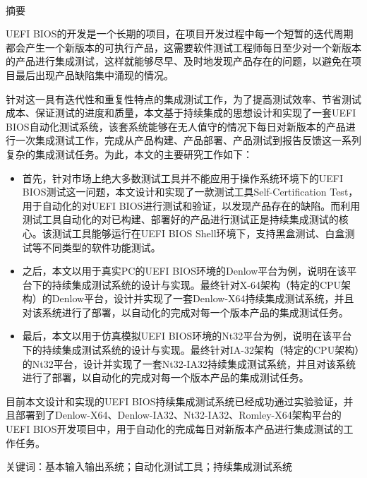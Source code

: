 \newpage

\pagestyle{plain}
\clearpage{}

\begin{center}
  {\sanhao[1.5]\heiti\oucctitle\\\vskip7pt 摘\hspace{1em}要}
\end{center}
{\normalsize\songti

  UEFI BIOS的开发是一个长期的项目，在项目开发过程中每一个短暂的迭代周期都会产生一个新版本的可执行产品，这需要软件测试工程师每日至少对一个新版本的产品进行集成测试，这样就能够尽早、及时地发现产品存在的问题，以避免在项目最后出现产品缺陷集中涌现的情况。
  
  针对这一具有迭代性和重复性特点的集成测试工作，为了提高测试效率、节省测试成本、保证测试的进度和质量，本文基于持续集成的思想设计和实现了一套UEFI BIOS自动化测试系统，该套系统能够在无人值守的情况下每日对新版本的产品进行一次集成测试工作，完成从产品构建、产品部署、产品测试到报告反馈这一系列复杂的集成测试任务。为此，本文的主要研究工作如下：
  \begin{itemize}
    \item 首先，针对市场上绝大多数测试工具并不能应用于操作系统环境下的UEFI BIOS测试这一问题，本文设计和实现了一款测试工具Self-Certification Test，用于自动化的对UEFI BIOS进行测试和验证，以发现产品存在的缺陷。而利用测试工具自动化的对已构建、部署好的产品进行测试正是持续集成测试的核心。该测试工具能够运行在UEFI BIOS Shell环境下，支持黑盒测试、白盒测试等不同类型的软件功能测试。
	\item 之后，本文以用于真实PC的UEFI BIOS环境的Denlow平台为例，说明在该平台下的持续集成测试系统的设计与实现。最终针对X-64架构（特定的CPU架构）的Denlow平台，设计并实现了一套Denlow-X64持续集成测试系统，并且对该系统进行了部署，以自动化的完成对每一个版本产品的集成测试任务。
	\item 最后，本文以用于仿真模拟UEFI BIOS环境的Nt32平台为例，说明在该平台下的持续集成测试系统的设计与实现。最终针对IA-32架构（特定的CPU架构）的Nt32平台，设计并实现了一套Nt32-IA32持续集成测试系统，并且对该系统进行了部署，以自动化的完成对每一个版本产品的集成测试任务。
  \end{itemize}

  目前本文设计和实现的UEFI BIOS持续集成测试系统已经成功通过实验验证，并且部署到了Denlow-X64、Denlow-IA32、Nt32-IA32、Romley-X64架构平台的UEFI BIOS开发项目中，用于自动化的完成每日对新版本产品进行集成测试的工作任务。
}
\vskip12bp
{\xiaosi\heiti\noindent
关键词：基本输入输出系统；自动化测试工具；持续集成测试系统}

